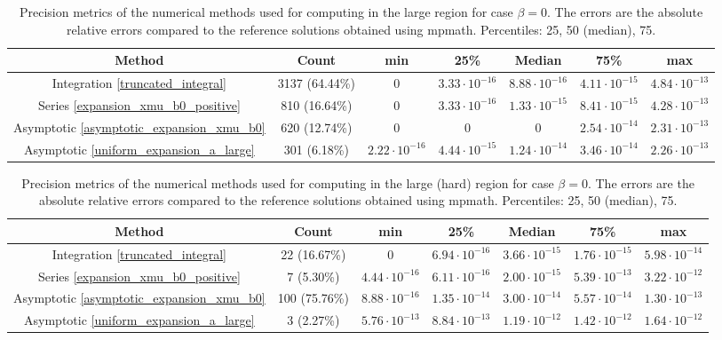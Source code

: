 \documentclass[10pt,a4paper,oneside]{article}
\numberwithin{equation}{section}
\begin{document}
\begin{table}[htbp]
\centering
\scalebox{0.9}
{
\begin{tabular}{ccccccc}
\hline
Method & Count & min & 25\% & Median & 75\% & max\\
\hline
Integration \eqref{truncated_integral} & 3137 (64.44\%) & 0 & $3.33\cdot 10^{-16}$ & $8.88\cdot 10^{-16}$ & $4.11\cdot 10^{-15}$ & $4.84\cdot 10^{-13}$\\
Series \eqref{expansion_xmu_b0_positive} & 810 (16.64\%) & 0 & $3.33\cdot 10^{-16}$ & $1.33\cdot 10^{-15}$ & $8.41\cdot 10^{-15}$ & $4.28\cdot 10^{-13}$\\
Asymptotic \eqref{asymptotic_expansion_xmu_b0} & 620 (12.74\%) & 0 & 0 & 0 & $2.54\cdot 10^{-14}$ & $2.31\cdot 10^{-13}$\\
Asymptotic \eqref{uniform_expansion_a_large} & 301 (6.18\%) & $2.22\cdot 10^{-16}$ & $4.44\cdot 10^{-15}$ & $1.24\cdot 10^{-14}$ & $3.46\cdot 10^{-14}$ & $2.26\cdot 10^{-13}$\\
	\hline
	\end{tabular}
	}
	\caption{Precision metrics of the numerical methods used for computing in the large region for case $\beta = 0$. The errors are the absolute relative errors compared to the reference solutions obtained using mpmath. Percentiles: 25, 50 (median), 75.}
	\label{table_methods_case_beta_eq_zero_large}
\end{table}


\begin{table}[htbp]
\centering
\scalebox{0.9}
{
\begin{tabular}{ccccccc}
\hline
Method & Count & min & 25\% & Median & 75\% & max\\
\hline
Integration \eqref{truncated_integral} & 22 (16.67\%) & 0 & $6.94\cdot 10^{-16}$ & $3.66\cdot 10^{-15}$ & $1.76\cdot 10^{-15}$ & $5.98\cdot 10^{-14}$\\
Series \eqref{expansion_xmu_b0_positive} & 7 (5.30\%) & $4.44\cdot 10^{-16}$ & $6.11\cdot 10^{-16}$ & $2.00\cdot 10^{-15}$ & $5.39\cdot 10^{-13}$ & $3.22\cdot 10^{-12}$\\
Asymptotic \eqref{asymptotic_expansion_xmu_b0} & 100 (75.76\%) & $8.88\cdot 10^{-16}$ & $1.35\cdot 10^{-14}$ & $3.00\cdot 10^{-14}$ & $5.57\cdot 10^{-14}$ & $1.30\cdot 10^{-13}$\\
Asymptotic \eqref{uniform_expansion_a_large} & 3 (2.27\%) & $5.76\cdot 10^{-13}$ & $8.84\cdot 10^{-13}$ & $1.19\cdot 10^{-12}$ & $1.42\cdot 10^{-12}$ & $1.64\cdot 10^{-12}$\\
	\hline
\end{tabular}
}
	\caption{Precision metrics of the numerical methods used for computing in the large (hard) region for case $\beta = 0$. The errors are the absolute relative errors compared to the reference solutions obtained using mpmath. Percentiles: 25, 50 (median), 75.}
	\label{table_methods_case_beta_eq_zero_large_hard}
\end{table}
\end{document}
